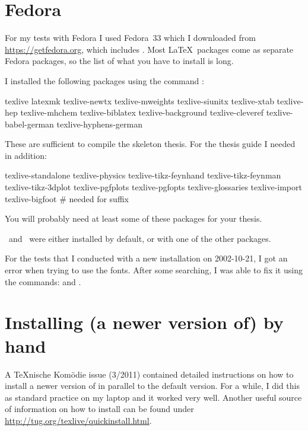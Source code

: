 \section{Fedora}%
\label{sec:app:fedora}

For my tests with Fedora I used Fedora~33 which I downloaded from
\url{https://getfedora.org},
which includes .
Most \LaTeX\ packages come as separate Fedora packages,
so the list of what you have to install is long.

I installed the following packages using the command :
\begin{bashlisting}
texlive
latexmk
texlive-newtx
texlive-mweights
texlive-siunitx
texlive-xtab
texlive-hep
texlive-mhchem
texlive-biblatex
texlive-background
texlive-cleveref
texlive-babel-german
texlive-hyphens-german
\end{bashlisting}

These are sufficient to compile the skeleton thesis.
For the thesis guide I needed in addition:
\begin{bashlisting}
texlive-standalone
texlive-physics
texlive-tikz-feynhand
texlive-tikz-feynman
texlive-tikz-3dplot
texlive-pgfplots
texlive-pgfopts
texlive-glossaries
texlive-import
texlive-bigfoot # needed for suffix
\end{bashlisting}
You will probably need at least some of these packages for your thesis.

\LuaLaTeX\ and \XeLaTeX\ were either installed by default,
or with one of the other packages.

For the tests that I conducted with a new installation on 2002-10-21,
I got an error when trying to use the  fonts.
After some searching, I was able to fix it using the commands:
 and .

  
\section{Installing (a newer version of) \TeXLive by hand}%
\label{sec:app:texlive:update}

A \TeX nische Komödie issue (3/2011) contained detailed instructions on
how to install a newer version of \TeXLive in parallel to the
default version.
For a while, I did this as standard practice on my laptop and it worked very well.
Another useful source of information on how to install \TeXLive can be found under
\url{http://tug.org/texlive/quickinstall.html}.


